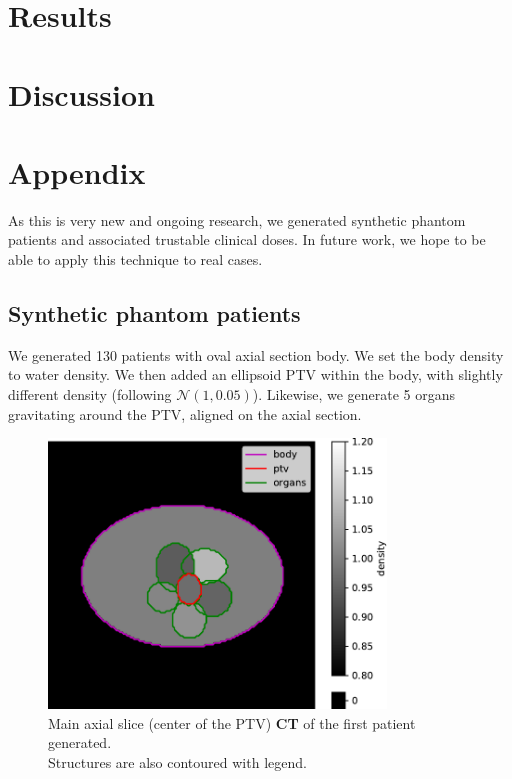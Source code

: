 \section{Results}



\section{Discussion}


\section*{Appendix}
As this is very new and ongoing research, we generated synthetic phantom patients and associated trustable clinical doses.
In future work, we hope to be able to apply this technique to real cases.

\subsection*{Synthetic phantom patients}
We generated 130 patients with oval axial section body.
We set the body density to water density.
We then added an ellipsoid PTV within the body, with slightly different density (following $\mathcal{N}(1,0.05)$).
Likewise, we generate 5 organs gravitating around the PTV, aligned on the axial section.

\begin{figure}
	\centering
	\includegraphics[width=0.8\textwidth]{main_slice-ct.pdf}
	\caption{Main axial slice (center of the PTV) \textbf{CT} of the first patient generated.\\
	Structures are also contoured with legend.}
	\label{fig:main_slice-ct}
\end{figure}

